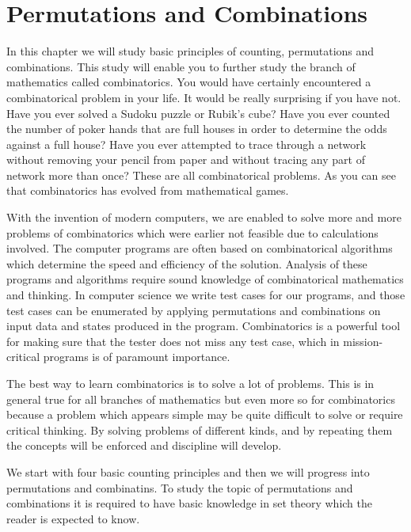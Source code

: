 \chapter{Permutations and Combinations}
In this chapter we will study basic principles of counting, permutations and combinations. This study will enable you to further
study the branch of mathematics called combinatorics. You would have certainly encountered a combinatorical problem in your
life. It would be really surprising if you have not. Have you ever solved a Sudoku puzzle or Rubik's cube? Have you ever counted
the number of poker hands that are full houses in order to determine the odds against a full house? Have you ever attempted to
trace through a network without removing your pencil from paper and without tracing any part of network more than once? These are
all combinatorical problems. As you can see that combinatorics has evolved from mathematical games.

With the invention of modern computers, we are enabled to solve more and more problems of combinatorics which were earlier not
feasible due to calculations involved. The computer programs are often based on combinatorical algorithms which determine the speed
and efficiency of the solution. Analysis of these programs and algorithms require sound knowledge of combinatorical mathematics and
thinking. In computer science we write test cases for our programs, and those test cases can be enumerated by applying permutations
and combinations on input data and states produced in the program. Combinatorics is a powerful tool for making sure that the tester
does not miss any test case, which in mission-critical programs is of paramount importance.

The best way to learn combinatorics is to solve a lot of problems. This is in general true for all branches of mathematics but even
more so for combinatorics because a problem which appears simple may be quite difficult to solve or require critical thinking. By
solving problems of different kinds, and by repeating them the concepts will be enforced and discipline will develop.

We start with four basic counting principles and then we will progress into permutations and combinatins. To study the topic of
permutations and combinations it is required to have basic knowledge in set theory which the reader is expected to know.

